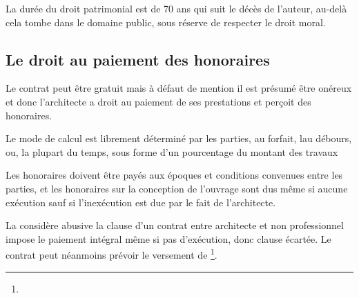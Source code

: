 			La durée du droit patrimonial est de 70 ans qui suit le décès de l’auteur, au-delà cela tombe dans le domaine public, sous réserve de respecter le droit moral.


	\subsection{Le droit au paiement des honoraires}

		Le contrat peut être gratuit mais à défaut de mention il est présumé être onéreux et donc l’architecte a droit au paiement de ses prestations et perçoit des honoraires.


		Le mode de calcul est librement déterminé par les parties, au forfait, lau débours, ou, la plupart du temps, sous forme d'un pourcentage du montant des travaux


		Les honoraires doivent être payés aux époques et conditions convenues entre les parties, et les honoraires sur la conception de l’ouvrage sont dus même si aucune exécution sauf si l’inexécution est due par le fait de l’architecte.


		La \CourDeCas considère abusive la clause d’un contrat entre architecte et non professionnel impose le paiement intégral même si pas d’exécution, donc clause écartée. Le contrat peut néanmoins prévoir le versement de \di\footnote{\aVerifier}.

